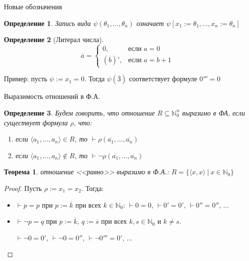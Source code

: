 \documentclass[aspectratio=169]{beamer}
\newtheorem{thm}{Теорема}[section]
\newtheorem{dfn}{Определение}[section]
\begin{document}
\begin{frame}{Новые обозначения}
\begin{dfn}
Запись вида $\psi(\theta_1,\dots,\theta_n)$ означает
$\psi[x_1:=\theta_1,\dots,x_n:=\theta_n]$
\end{dfn}\pause

\begin{dfn}[Литерал числа]
$$\overline{a} = \left\{\begin{array}{ll} 0, &\mbox{если } a = 0\\
                (\overline{b})', &\mbox{если } a = b+1
\end{array}\right.$$
\end{dfn}\pause

Пример: пусть $\psi := x_1 = 0$. \pause Тогда $\psi(\overline{3})$ соответствует формуле $0''' = 0$

\end{frame}

\begin{frame}{Выразимость отношений в Ф.А.}
\begin{dfn}
Будем говорить, что отношение $R\subseteq \mathbb{N}^n_0$ выразимо в ФА, 
если существует формула $\rho$, что:
\begin{enumerate}
\item если $\langle a_1,\dots,a_n \rangle \in R$, то $\vdash \rho(\overline{a_1},\dots,\overline{a_n})$
\item если $\langle a_1,\dots,a_n \rangle \notin R$, то $\vdash \neg\rho(\overline{a_1},\dots,\overline{a_n})$
\end{enumerate}
\end{dfn}\pause

\begin{thm} отношение <<равно>> выразимо в Ф.А.:
$R = \{ \langle x,x \rangle\ |\ x \in \mathbb{N}_0 \}$
\end{thm}\pause

\begin{proof}
Пусть $\rho := x_1=x_2$. \pause Тогда:
\begin{itemize}
\item $\vdash p = p$ при $p := \overline{k}$ при всех $k \in \mathbb{N}_0$: \pause $\vdash 0=0$, $\vdash 0'=0'$, $\vdash 0''=0''$, ... \pause
\item $\vdash \neg p = q$ при $p := \overline{k}$, $q := \overline{s}$ при всех $k,s \in \mathbb{N}_0$ и $k \ne s$.

\pause $\vdash \neg 0 = 0'$, $\vdash \neg 0 = 0''$, $\vdash \neg 0''' = 0'$, ...
\end{itemize}
\end{proof}
\end{frame}
\end{document}
